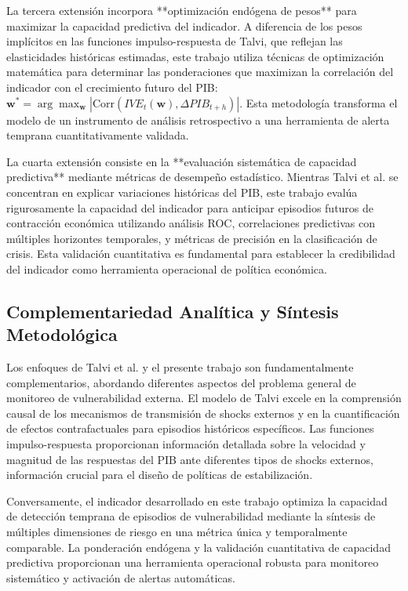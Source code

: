 \documentclass[3p,11pt]{elsarticle}
\begin{document}
La tercera extensión incorpora **optimización endógena de pesos** para maximizar la capacidad predictiva del indicador. A diferencia de los pesos implícitos en las funciones impulso-respuesta de Talvi, que reflejan las elasticidades históricas estimadas, este trabajo utiliza técnicas de optimización matemática para determinar las ponderaciones que maximizan la correlación del indicador con el crecimiento futuro del PIB: $\mathbf{w}^* = \arg\max_{\mathbf{w}} |\text{Corr}(IVE_t(\mathbf{w}), \Delta PIB_{t+h})|$. Esta metodología transforma el modelo de un instrumento de análisis retrospectivo a una herramienta de alerta temprana cuantitativamente validada.

La cuarta extensión consiste en la **evaluación sistemática de capacidad predictiva** mediante métricas de desempeño estadístico. Mientras Talvi et al. se concentran en explicar variaciones históricas del PIB, este trabajo evalúa rigurosamente la capacidad del indicador para anticipar episodios futuros de contracción económica utilizando análisis ROC, correlaciones predictivas con múltiples horizontes temporales, y métricas de precisión en la clasificación de crisis. Esta validación cuantitativa es fundamental para establecer la credibilidad del indicador como herramienta operacional de política económica.

\subsection{Complementariedad Analítica y Síntesis Metodológica}

Los enfoques de Talvi et al. y el presente trabajo son fundamentalmente complementarios, abordando diferentes aspectos del problema general de monitoreo de vulnerabilidad externa. El modelo de Talvi excele en la comprensión causal de los mecanismos de transmisión de shocks externos y en la cuantificación de efectos contrafactuales para episodios históricos específicos. Las funciones impulso-respuesta proporcionan información detallada sobre la velocidad y magnitud de las respuestas del PIB ante diferentes tipos de shocks externos, información crucial para el diseño de políticas de estabilización.

Conversamente, el indicador desarrollado en este trabajo optimiza la capacidad de detección temprana de episodios de vulnerabilidad mediante la síntesis de múltiples dimensiones de riesgo en una métrica única y temporalmente comparable. La ponderación endógena y la validación cuantitativa de capacidad predictiva proporcionan una herramienta operacional robusta para monitoreo sistemático y activación de alertas automáticas.
\end{document}
